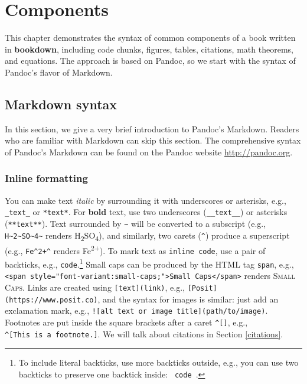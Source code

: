 \documentclass[
  12pt,
]{krantz}
\theoremstyle{definition}
\theoremstyle{definition}
\theoremstyle{definition}
\theoremstyle{definition}
\theoremstyle{remark}
\begin{document}
\chapter{Components}\label{components}

This chapter demonstrates the syntax of common components of a book written in \textbf{bookdown}, including code chunks, figures, tables, citations, math theorems, and equations. The approach is based on Pandoc, so we start with the syntax of Pandoc's flavor of Markdown.

\section{Markdown syntax}\label{markdown-syntax}

In this section, we give a very brief introduction to Pandoc's Markdown. Readers who are familiar with Markdown can skip this section. The comprehensive syntax of Pandoc's Markdown can be found on the Pandoc website \url{http://pandoc.org}.

\subsection{Inline formatting}\label{inline-formatting}

You can make text \emph{italic} by surrounding it with underscores or asterisks, e.g., \texttt{\_text\_} or \texttt{*text*}. For \textbf{bold} text, use two underscores (\texttt{\_\_text\_\_}) or asterisks (\texttt{**text**}). Text surrounded by \texttt{\textasciitilde{}} will be converted to a subscript (e.g., \texttt{H\textasciitilde{}2\textasciitilde{}SO\textasciitilde{}4\textasciitilde{}} renders H\textsubscript{2}SO\textsubscript{4}), and similarly, two carets (\texttt{\^{}}) produce a superscript (e.g., \texttt{Fe\^{}2+\^{}} renders Fe\textsuperscript{2+}). To mark text as \texttt{inline\ code}, use a pair of backticks, e.g., \texttt{\textasciigrave{}code\textasciigrave{}}.\footnote{To include literal backticks, use more backticks outside, e.g., you can use two backticks to preserve one backtick inside: \texttt{\textasciigrave{}\textasciigrave{}\ \textasciigrave{}code\textasciigrave{}\ \textasciigrave{}\textasciigrave{}}.} Small caps can be produced by the HTML tag \texttt{span}, e.g., \texttt{\textless{}span\ style="font-variant:small-caps;"\textgreater{}Small\ Caps\textless{}/span\textgreater{}} renders \textsc{Small Caps}. Links are created using \texttt{{[}text{]}(link)}, e.g., \texttt{{[}Posit{]}(https://www.posit.co)}, and the syntax for images is similar: just add an exclamation mark, e.g., \texttt{!{[}alt\ text\ or\ image\ title{]}(path/to/image)}. Footnotes are put inside the square brackets after a caret \texttt{\^{}{[}{]}}, e.g., \texttt{\^{}{[}This\ is\ a\ footnote.{]}}. We will talk about citations in Section \ref{citations}.
\end{document}
